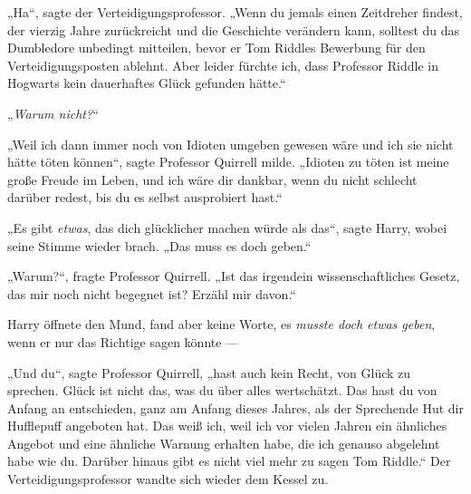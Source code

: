 „Ha“, sagte der Verteidigungsprofessor.
„Wenn du jemals einen Zeitdreher findest, der vierzig Jahre zurückreicht und die Geschichte verändern kann, solltest du das Dumbledore unbedingt mitteilen, bevor er Tom Riddles Bewerbung für den Verteidigungsposten ablehnt. Aber leider fürchte ich, dass Professor Riddle in Hogwarts kein dauerhaftes Glück gefunden hätte.“

„\emph{Warum nicht?}“

„Weil ich dann immer noch von Idioten umgeben gewesen wäre und ich sie nicht hätte töten können“, sagte Professor Quirrell milde.
„Idioten zu töten ist meine große Freude im Leben, und ich wäre dir dankbar, wenn du nicht schlecht darüber redest, bis du es selbst ausprobiert hast.“

„Es gibt \emph{etwas}, das dich glücklicher machen würde als das“, sagte Harry, wobei seine Stimme wieder brach.
„Das muss es doch geben.“

„Warum?“, fragte Professor Quirrell.
„Ist das irgendein wissenschaftliches Gesetz, das mir noch nicht begegnet ist? Erzähl mir davon.“

Harry öffnete den Mund, fand aber keine Worte, es \emph{musste doch etwas geben}, wenn er nur das Richtige sagen könnte —

„Und du“, sagte Professor Quirrell, „hast auch kein Recht, von Glück zu sprechen. Glück ist nicht das, was du über alles wertschätzt. Das hast du von Anfang an entschieden, ganz am Anfang dieses Jahres, als der Sprechende Hut dir Hufflepuff angeboten hat. Das weiß ich, weil ich vor vielen Jahren ein ähnliches Angebot und eine ähnliche Warnung erhalten habe, die ich genauso abgelehnt habe wie du. Darüber hinaus gibt es nicht viel mehr zu sagen Tom Riddle.“
Der Verteidigungsprofessor wandte sich wieder dem Kessel zu.

